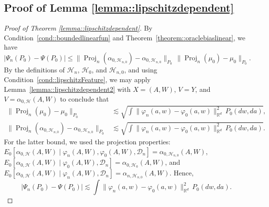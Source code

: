\documentclass[11pt]{article}
\theoremstyle{definition}
\begin{document}
\subsection{Proof of Lemma \ref{lemma::lipschitzdependent}}
 

\begin{proof}[Proof of Theorem \ref{lemma::lipschitzdependent}]
By Condition~\ref{cond::boundedlinearfun} and Theorem~\ref{theorem::oraclebiaslinear}, we have
\[
|\Psi_n(P_0) - \Psi(P_0)| \leq \|\operatorname{Proj}_n(\alpha_{0,\mathcal{H}_{n,0}}) - \alpha_{0,\mathcal{H}_{n,0}}\|_{P_0} \, \| \operatorname{Proj}_n(\mu_0) - \mu_0 \|_{P_0}.
\]
By the definitions of $\mathcal{H}_n$, $\mathcal{H}_0$, and $\mathcal{H}_{n,0}$, and using Condition~\ref{cond::lipschitzFeature}, we may apply Lemma~\ref{lemma::lipschitzdependent2} with \(X = (A,W)\), \(V = Y\), and \(V = \alpha_{0,\mathcal{H}}(A,W)\) to conclude that
\begin{align*}
    \|\operatorname{Proj}_n(\mu_0) - \mu_0\|_{P_0} 
    &\lesssim \sqrt{\int \|\varphi_n(a,w) - \varphi_0(a,w)\|_{\mathbb{R}^d}^2 \, P_0(dw, da)}, \\
    \|\operatorname{Proj}_n(\alpha_{0,\mathcal{H}_{n,0}}) - \alpha_{0,\mathcal{H}_{n,0}}\|_{P_0} 
    &\lesssim \sqrt{\int \|\varphi_n(a,w) - \varphi_0(a,w)\|_{\mathbb{R}^d}^2 \, P_0(dw, da)}.
\end{align*}
For the latter bound, we used the projection properties: \(E_0[\alpha_{0,\mathcal{H}}(A,W) \mid \varphi_n(A,W), \varphi_0(A,W), \mathcal{D}_n] = \alpha_{0,\mathcal{H}_{n,0}}(A,W)\), \(E_0[\alpha_{0,\mathcal{H}}(A,W) \mid \varphi_0(A,W), \mathcal{D}_n] = \alpha_{0,\mathcal{H}_0}(A,W)\), and \(E_0[\alpha_{0,\mathcal{H}}(A,W) \mid \varphi_n(A,W), \mathcal{D}_n] = \alpha_{n,\mathcal{H}_{n,0}}(A,W)\). Hence,
\[
|\Psi_n(P_0) - \Psi(P_0)| \lesssim \int \|\varphi_n(a,w) - \varphi_0(a,w)\|_{\mathbb{R}^d}^2 \, P_0(dw, da).
\]
\end{proof}
\end{document}
